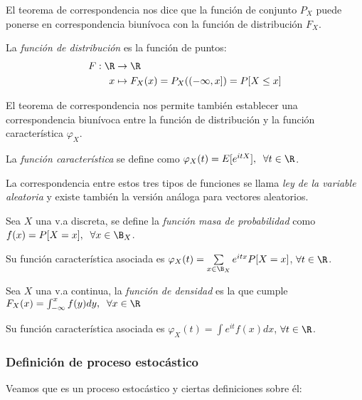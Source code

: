 
El teorema de correspondencia nos dice que la función de conjunto $P_X$ puede ponerse en correspondencia biunívoca con la función de distribución $F_X$.

\begin{ndef}
  La \emph{función de distribución} es la función de puntos:
  \begin{align*}
    F: \R & \to \R \\
    x & \mapsto  F_X(x) = P_X((-\infty, x]) = P[X \leq x]
  \end{align*}
\end{ndef}

El teorema de correspondencia nos permite también establecer una correspondencia biunívoca entre la función de distribución y la función característica $\varphi_X$.

\begin{ndef}
  La \emph{función característica} se define como $\varphi_X(t) = E[e^{itX}], \; \; \forall t \in \R$.
\end{ndef}

La correspondencia entre estos tres tipos de funciones se llama \emph{ley de la variable aleatoria} y existe también la versión análoga para vectores aleatorios.

\begin{ndef}
  Sea $X$ una v.a discreta, se define la \emph{función masa de probabilidad} como $f(x) = P[X = x], \; \; \forall x \in \B_X$.
\end{ndef}

Su función característica asociada es $\varphi_X(t) = \sum \limits_{x \in \B_X} e^{itx} P[X = x]$, $\forall t \in \R$.

\begin{ndef}
  Sea $X$ una v.a continua, la \emph{función de densidad} es la que cumple $F_X(x) = \int^x_{-\infty} f(y) dy, \; \; \forall x \in \R $
\end{ndef}

Su función característica asociada es $\varphi_X(t) = \int e^{it} f(x) dx$, $\forall t \in \R$.

\subsubsection{Definición de proceso estocástico}

Veamos que es un proceso estocástico y ciertas definiciones sobre él:

